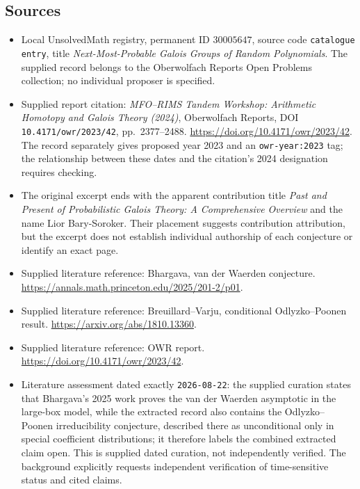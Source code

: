 \documentclass[11pt]{article}
\begin{document}
\subsection{Sources}
\begin{itemize}
\item Local UnsolvedMath registry, permanent ID \(30005647\), source code \texttt{catalogue entry}, title \emph{Next-Most-Probable Galois Groups of Random Polynomials}. The supplied record belongs to the Oberwolfach Reports Open Problems collection; no individual proposer is specified.
\item Supplied report citation: \emph{MFO--RIMS Tandem Workshop: Arithmetic Homotopy and Galois Theory (2024)}, Oberwolfach Reports, DOI \texttt{10.4171/owr/2023/42}, pp.\ 2377--2488. \url{https://doi.org/10.4171/owr/2023/42}. The record separately gives proposed year 2023 and an \texttt{owr-year:2023} tag; the relationship between these dates and the citation's 2024 designation requires checking.
\item The original excerpt ends with the apparent contribution title \emph{Past and Present of Probabilistic Galois Theory: A Comprehensive Overview} and the name Lior Bary-Soroker. Their placement suggests contribution attribution, but the excerpt does not establish individual authorship of each conjecture or identify an exact page.
\item Supplied literature reference: Bhargava, van der Waerden conjecture. \url{https://annals.math.princeton.edu/2025/201-2/p01}.
\item Supplied literature reference: Breuillard--Varju, conditional Odlyzko--Poonen result. \url{https://arxiv.org/abs/1810.13360}.
\item Supplied literature reference: OWR report. \url{https://doi.org/10.4171/owr/2023/42}.
\item Literature assessment dated exactly \texttt{2026-08-22}: the supplied curation states that Bhargava's 2025 work proves the van der Waerden asymptotic in the large-box model, while the extracted record also contains the Odlyzko--Poonen irreducibility conjecture, described there as unconditional only in special coefficient distributions; it therefore labels the combined extracted claim open. This is supplied dated curation, not independently verified. The background explicitly requests independent verification of time-sensitive status and cited claims.
\end{itemize}
\end{document}
